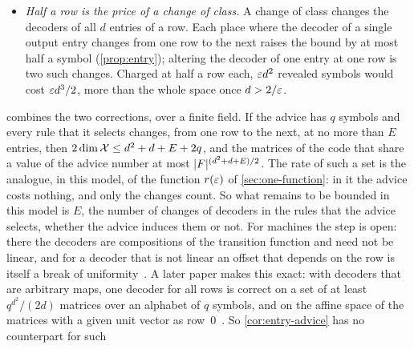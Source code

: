 \begin{enumerate}[leftmargin=2em]
\begin{itemize}[leftmargin=1.5em]
function of its own of $\alpha(X)$, for a linear map $\alpha$ of rank $q$, the bound of \cref{thm:TP} rises by at most
$q$ dimensions~\cite[Theorem~5.2]{ClassUniformMemo2026}. And every code can gain the full rank: a code
together with the image of a projection $p$ that vanishes on it is a code with advice $p$, of dimension larger by the
rank of~$p$~\cite[Proposition~5.3]{ClassUniformMemo2026}. Over a finite field the advice may be any map to a set of
$\abs F^q$ values, and its value may select the colouring and the decoders and add an offset to every row: if every
colouring that it selects has at most $s\ge1$ class changes, the code has dimension at most
$(d^2+ds)/2+q$~\cite[Theorem~5.5]{ClassUniformMemo2026}. So advice that enters the rows additively induces no change
of class.
\item \emph{Half a row is the price of a change of class.} A change of class changes the decoders of all $d$ entries of
a row. Each place where the decoder of a single output entry changes from one row to the next raises the bound by at
most half a symbol (\cref{prop:entry}); altering the decoder of one entry at one row is two such changes. Charged at
half a row each, $\varepsilon d^2$ revealed symbols would cost $\varepsilon d^3/2$, more than the whole space once $d>2/\varepsilon$.
\end{itemize}
 combines the two corrections, over a finite field. If the advice has $q$ symbols and every
rule that it selects changes, from one row to the next, at no more than $E$ entries, then $2\dim\mathcal{X}\le d^2+d+E+2q$,
and the matrices of the code that share a value of the advice number at most $\lvert F \rvert^{(d^2+d+E)/2}$. The rate of such
a set is the analogue, in this model, of the function $r(\varepsilon)$ of \cref{sec:one-function}: in it the advice costs
nothing, and only the changes count. So what remains to be bounded in this model is $E$, the number of changes of
decoders in the rules that the advice selects, whether the advice induces them or not. For machines the step is open: there the decoders are compositions of the transition
function and need not be linear, and for a decoder that is not linear an offset that depends on the row is itself a
break of uniformity~\cite[Remark~5.6]{ClassUniformMemo2026}. A later paper makes this exact: with decoders that are
arbitrary maps, one decoder for all rows is correct on a set of at least $q^{d^2}/(2d)$ matrices over an alphabet of
$q$ symbols, and on the affine space of the matrices with a given unit vector as row~$0$~\cite[Theorem~A.1,
Corollary~A.2 and Proposition~4.5]{SharedDecoders2026}. So \cref{cor:entry-advice} has no counterpart for such

\end{enumerate}
